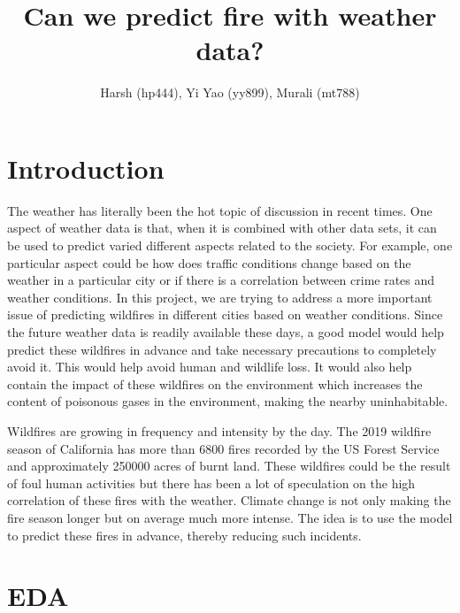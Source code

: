\documentclass[10pt]{article}
\begin{document}
\title{\bf Can we predict fire with weather data?}
\author{Harsh (hp444), Yi Yao (yy899), Murali (mt788)}
\maketitle

\begin{abstract}
\end{abstract}

\tableofcontents

\section{Introduction}
The weather has literally been the hot topic of discussion in recent times.
One aspect of weather data is that, when it is combined with other data
sets, it can be used to predict varied different aspects related to
the society. For example, one particular aspect could be how does traffic
conditions change based on the weather in a particular city or if there is
a correlation between crime rates and weather conditions. In this project,
we are trying to address a more important issue of predicting wildfires in
different cities based on weather conditions. Since the future weather data
is readily available these days, a good model would help predict these
wildfires in advance and take necessary precautions to completely avoid it.
This would help avoid human and wildlife loss. It would also help contain
the impact of these wildfires on the environment which increases the
content of poisonous gases in the environment, making the nearby
uninhabitable.\par
Wildfires are growing in frequency and intensity by the day. The 2019
wildfire season of California has more than 6800 fires recorded by the US
Forest Service and approximately 250000 acres of burnt land. These
wildfires could be the result of foul human activities but there has been
a lot of speculation on the high correlation of these fires with the
weather. Climate change is not only making the fire season longer but on
average much more intense. The idea is to use the model to predict these
fires in advance, thereby reducing such incidents.\par
\section{EDA}
\end{document}
